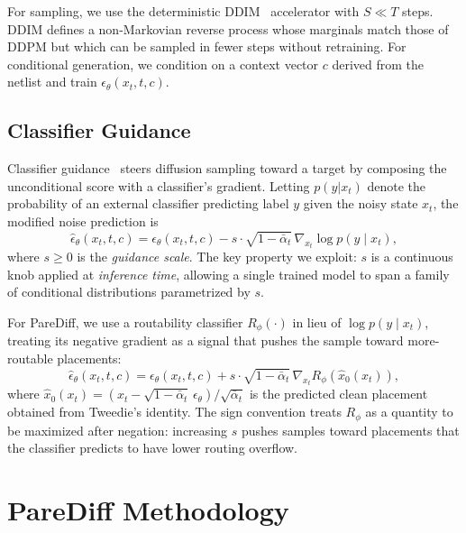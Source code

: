 \documentclass[lettersize,journal]{IEEEtran}
\begin{document}
For sampling, we use the deterministic DDIM~\cite{song2021ddim} accelerator with $S \ll T$ steps. DDIM defines a non-Markovian reverse process whose marginals match those of DDPM but which can be sampled in fewer steps without retraining. For conditional generation, we condition on a context vector $c$ derived from the netlist and train $\epsilon_\theta(x_t, t, c)$.

\subsection{Classifier Guidance}

Classifier guidance~\cite{dhariwal2021guidance} steers diffusion sampling toward a target by composing the unconditional score with a classifier's gradient. Letting $p(y | x_t)$ denote the probability of an external classifier predicting label $y$ given the noisy state $x_t$, the modified noise prediction is
\begin{equation}
\label{eq:guidance}
\hat{\epsilon}_\theta(x_t, t, c) = \epsilon_\theta(x_t, t, c) - s \cdot \sqrt{1 - \bar{\alpha}_t}\, \nabla_{x_t}\!\log p(y \mid x_t),
\end{equation}
where $s \ge 0$ is the \emph{guidance scale}. The key property we exploit: $s$ is a continuous knob applied at \emph{inference time}, allowing a single trained model to span a family of conditional distributions parametrized by $s$.

For PareDiff, we use a routability classifier $R_\phi(\cdot)$ in lieu of $\log p(y \mid x_t)$, treating its negative gradient as a signal that pushes the sample toward more-routable placements:
\begin{equation}
\label{eq:rout_guidance}
\hat{\epsilon}_\theta(x_t, t, c) = \epsilon_\theta(x_t, t, c) + s \cdot \sqrt{1 - \bar{\alpha}_t}\, \nabla_{x_t}\!R_\phi(\hat{x}_0(x_t)),
\end{equation}
where $\hat{x}_0(x_t) = (x_t - \sqrt{1 - \bar{\alpha}_t}\, \epsilon_\theta) / \sqrt{\bar{\alpha}_t}$ is the predicted clean placement obtained from Tweedie's identity. The sign convention treats $R_\phi$ as a quantity to be maximized after negation: increasing $s$ pushes samples toward placements that the classifier predicts to have lower routing overflow.

\section{PareDiff Methodology}
\label{sec:method}
\end{document}
